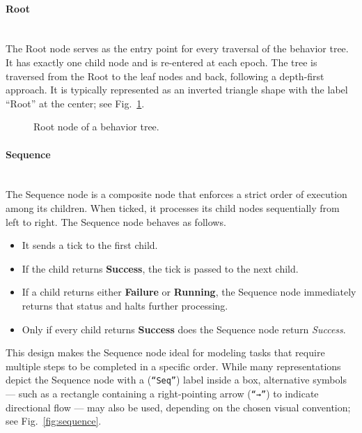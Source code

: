 \documentclass{CSSRforAfrica}
\begin{document}
\newpage



\paragraph{Root}~\\
The Root node serves as the entry point for every traversal of the behavior tree. It has exactly one child node and is re-entered at each epoch. The tree is traversed from the Root to the leaf nodes and back, following a depth-first approach.
It is typically represented as an inverted triangle shape with the label ``Root'' at the center; see Fig.~\ref{fig:root}.


\begin{figure}[h]
    \centering
    \caption{Root node of a behavior tree.}
    \label{fig:root}
\end{figure}




\paragraph{Sequence} ~\\
The Sequence node is a composite node that enforces a strict order of execution among its children. When ticked, it processes its child nodes sequentially from left to right. The Sequence node behaves as follows.
\begin{itemize}
    \item It sends a tick to the first child.
    \item If the child returns \textbf{Success}, the tick is passed to the next child.
    \item If a child returns either \textbf{Failure} or \textbf{Running}, the Sequence node immediately returns that status and halts further processing.
    \item Only if every child returns \textbf{Success} does the Sequence node return \textit{Success}.
\end{itemize}
This design makes the Sequence node ideal for modeling tasks that require multiple steps to be completed in a specific order. While many representations depict the Sequence node with a (\texttt{``Seq''}) label inside a box, alternative symbols --- such as a rectangle containing a right-pointing arrow (\texttt{``→''}) to indicate directional flow --- may also be used, depending on the chosen visual convention; see Fig.~\ref{fig:sequence}.
\end{document}
